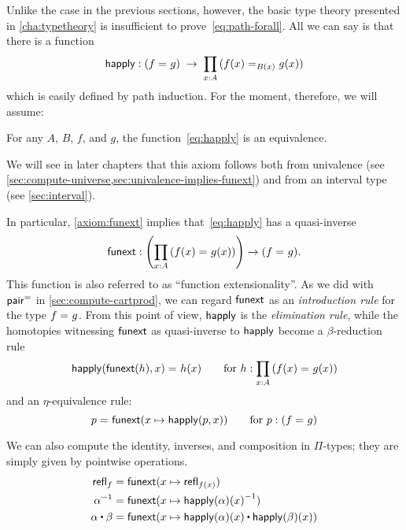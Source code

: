 Unlike the case in the previous sections, however, the basic type theory presented in \autoref{cha:typetheory} is insufficient to prove~\eqref{eq:path-forall}.
All we can say is that there is a function
\begin{equation}
  \happly : {(\id{f}{g})}\;\to\; \prd{x:A} (\id[B(x)]{f(x)}{g(x)})\label{eq:happly}
\end{equation}
which is easily defined by path induction.
For the moment, therefore, we will assume:

\begin{axiom}\label{axiom:funext}
  For any $A$, $B$, $f$, and $g$, the function~\eqref{eq:happly} is an equivalence.
\end{axiom}

We will see in later chapters that this axiom follows both from univalence (see \autoref{sec:compute-universe,sec:univalence-implies-funext}) and from an interval type (see \autoref{sec:interval}).

In particular, \autoref{axiom:funext} implies that~\eqref{eq:happly} has a quasi-inverse
\[
\funext : \left(\prd{x:A} (\id{f(x)}{g(x)})\right) \to {(\id{f}{g})}.
\]
This function is also referred to as ``function extensionality''.
As we did with $\mathsf{pair}^{\mathord{=}}$ in \autoref{sec:compute-cartprod}, we can regard $\mathsf{funext}$ as an \emph{introduction rule} for the type $f =_{} g$.
From this point of view, $\mathsf{happly}$ is the \emph{elimination rule}, while the homotopies witnessing $\mathsf{funext}$ as quasi-inverse to $\mathsf{happly}$ become a $\beta$-reduction rule
\[
\id{\happly({\funext{(h)}},x)}{h(x)} \qquad\text{for }h:\prd{x:A} (\id{f(x)}{g(x)})
\]
and an $\eta$-equivalence rule:
\[
p =_{} \mathsf{funext} (x \mapsto \mathsf{happly}(p,{x})) \qquad\text{for } p: (f =_{} g)
\]

We can also compute the identity, inverses, and composition in $\Pi$-types; they are simply given by pointwise operations.
\begin{align*}
\refl{f} &= \funext(x \mapsto \refl{f(x)}) \\
\opp{\alpha} &= \funext (x \mapsto \opp{\happly (\alpha)(x)})  \\
{\alpha} \ct \beta &= \funext (x \mapsto {\happly({\alpha})(x) \ct \happly({\beta})(x)})
\end{align*}

